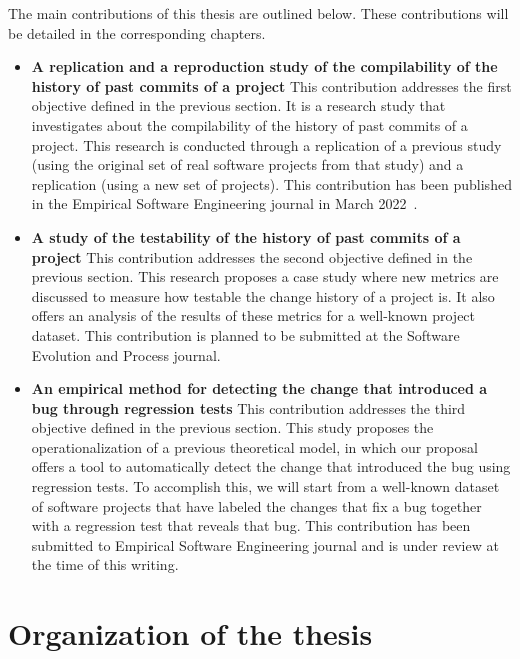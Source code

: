 The main contributions of this thesis are outlined below.
These contributions will be detailed in the corresponding chapters.

\begin{itemize}
    \item \textbf{A replication and a reproduction study of the compilability of the history of past commits of a project}
    This contribution addresses the first objective defined in the previous section.
    It is a research study that investigates about the compilability of the history of past commits of a project.
    This research is conducted through a replication of a previous study~\cite{tufano2017there} (using the original set of real software projects from that study) and a replication (using a new set of projects).
    This contribution has been published in the Empirical Software Engineering journal in March 2022~\cite{maes2022revisiting}.
    \item \textbf{A study of the testability of the history of past commits of a project}
    This contribution addresses the second objective defined in the previous section.
    This research proposes a case study where new metrics are discussed to measure how testable the change history of a project is. It also offers an analysis of the results of these metrics for a well-known project dataset.
    This contribution is planned to be submitted at the Software Evolution and Process journal.
    \item \textbf{An empirical method for detecting the change that introduced a bug through regression tests}
    This contribution addresses the third objective defined in the previous section. 
    This study proposes the operationalization of a previous theoretical model, in which our proposal offers a tool to automatically detect the change that introduced the bug using regression tests. 
    To accomplish this, we will start from a well-known dataset of software projects that have labeled the changes that fix a bug together with a regression test that reveals that bug.
    This contribution has been submitted to Empirical Software Engineering journal and is under review at the time of this writing.
\end{itemize}

\section{Organization of the thesis}

